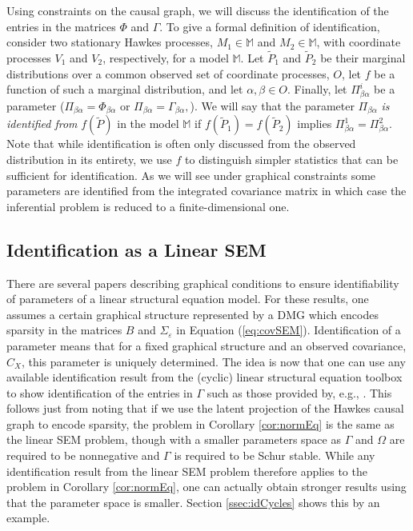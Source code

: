 \documentclass[accepted]{uai2021} %
\begin{document}
Using constraints on the causal graph, we will discuss the identification of 
the entries in the 
matrices $\Phi$ and $\Gamma$. To give a formal 
definition 
of 
identification, consider two stationary Hawkes 
processes, $M_1\in\mathbb{M}$ and $M_2\in\mathbb{M}$, with coordinate processes 
$V_1$ and $V_2$, 
respectively, for a model $\mathbb{M}$. Let $ \tilde{P}_1$ and $ 
\tilde{P}_2$ be their marginal 
distributions over a common observed set of 
coordinate processes, $O$, let $f$ be a function of 
such a marginal distribution, and let 
$\alpha,\beta\in O$. Finally, let $\Pi_{\beta\alpha}^i$ be a parameter 
($\Pi_{\beta\alpha} = \Phi_{\beta\alpha}$ or 
$\Pi_{\beta\alpha}=\Gamma_{\beta\alpha},$). We will say that the 
parameter 
$\Pi_{\beta\alpha}$ \emph{is 
identified from} 
$f(\tilde{P})$ in the model $\mathbb{M}$ if $f(\tilde{P}_1) = f(\tilde{P}_2)$ 
implies $\Pi_{\beta\alpha}^1 = 
\Pi_{\beta\alpha}^2$. Note that while 
identification 
is often only discussed from the 
observed distribution in its entirety, we use $f$ to distinguish simpler 
statistics that can be sufficient for identification. As we will see under 
graphical constraints some 
parameters are identified from the integrated covariance matrix in which case 
the inferential problem is reduced to a finite-dimensional one.



\subsection{Identification as a Linear SEM}

There are several papers describing graphical conditions to ensure 
identifiability of parameters of a linear structural equation model. For these 
results, one assumes a certain graphical structure represented by a DMG which 
encodes sparsity in the matrices $B$ and $\Sigma_\varepsilon$ in Equation 
(\ref{eq:covSEM}). Identification of a parameter means that for a fixed 
graphical structure and an observed covariance, $C_X$, this parameter is 
uniquely determined. The idea is now 
that one can use any available identification result from the (cyclic) linear 
structural equation toolbox to show identification of the entries in 
$\Gamma$ such as those provided by, e.g., \cite{foygelHalftrek2012, 
	chenNIPS2016, 
	weihs2018}. This follows just from noting that if we use the latent 
	projection of the Hawkes causal graph to encode sparsity, the problem in 
	Corollary \ref{cor:normEq} is the same as the linear SEM problem, though 
	with a smaller parameters space as $\Gamma$ and $\Omega$ are required to be 
	nonnegative and $\Gamma$ is required to be Schur stable. While any 
	identification result from the linear SEM problem therefore applies to the 
	problem in Corollary \ref{cor:normEq}, one can actually obtain stronger 
	results using that the parameter space is smaller. Section 
	\ref{ssec:idCycles} shows this by an example.
\end{document}
